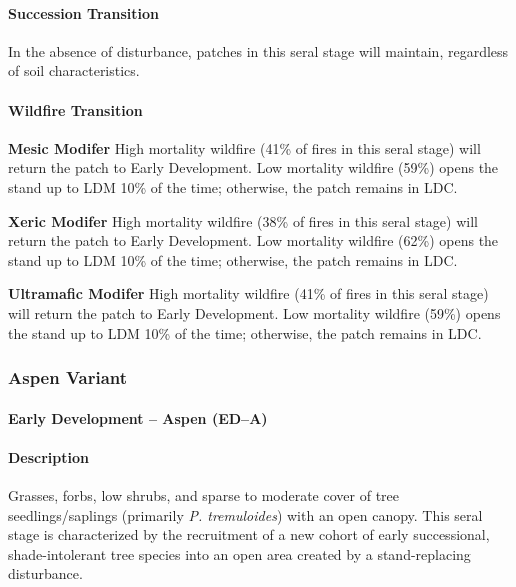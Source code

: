 \paragraph{Succession Transition} In the absence of disturbance, patches in this seral stage will maintain, regardless of soil characteristics.



\paragraph{Wildfire Transition}

\begin{adjustwidth}{2cm}{}
\textbf{Mesic Modifer } High mortality wildfire (41\% of fires in this seral stage) will return the patch to Early Development. Low mortality wildfire (59\%) opens the stand up to LDM 10\% of the time; otherwise, the patch remains in LDC. 

\textbf{Xeric Modifer} High mortality wildfire (38\% of fires in this seral stage) will return the patch to Early Development. Low mortality wildfire (62\%) opens the stand up to LDM 10\% of the time; otherwise, the patch remains in LDC. 

\textbf{Ultramafic Modifer} High mortality wildfire (41\% of fires in this seral stage) will return the patch to Early Development. Low mortality wildfire (59\%) opens the stand up to LDM 10\% of the time; otherwise, the patch remains in LDC.

\end{adjustwidth}

\noindent\hrulefill
\noindent\hrulefill

\subsubsection{Aspen Variant}

\paragraph{Early Development – Aspen (ED–A)}

\paragraph{Description} Grasses, forbs, low shrubs, and sparse to moderate cover of tree seedlings/saplings (primarily \emph{P. tremuloides}) with an open canopy. This seral stage is characterized by the recruitment of a new cohort of early successional, shade-intolerant tree species into an open area created by a stand-replacing disturbance. 


